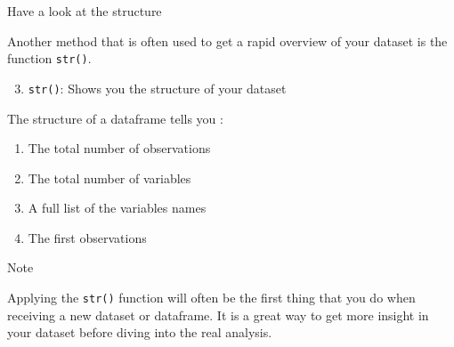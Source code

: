 \documentclass[
  ignorenonframetext,
]{beamer}
\providecommand{\tightlist}{%
  \setlength{\itemsep}{0pt}\setlength{\parskip}{0pt}}
\begin{document}
\begin{frame}[fragile]{Have a look at the structure}
\protect\hypertarget{have-a-look-at-the-structure}{}

Another method that is often used to get a rapid overview of your
dataset is the function \texttt{str()}.

\begin{enumerate}
\setcounter{enumi}{2}
\tightlist
\item
  \texttt{str()}: Shows you the structure of your dataset
\end{enumerate}

The structure of a dataframe tells you :

\begin{enumerate}
\tightlist
\item
  The total number of observations
\item
  The total number of variables
\item
  A full list of the variables names
\item
  The first observations
\end{enumerate}

\begin{block}{Note}

Applying the \texttt{str()} function will often be the first thing that
you do when receiving a new dataset or dataframe. It is a great way to
get more insight in your dataset before diving into the real analysis.

\end{block}

\end{frame}
\end{document}
